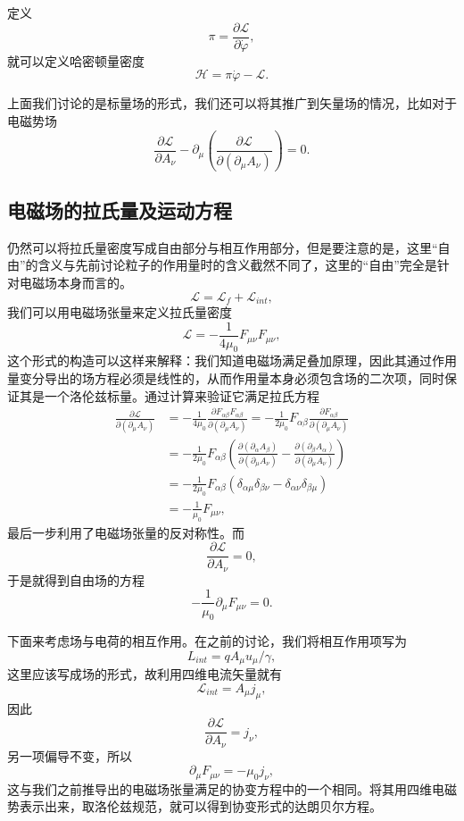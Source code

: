 \documentclass[UTF8]{ctexbook}
\numberwithin{equation}{chapter}
\begin{document}
	定义
	\[\pi=\frac{\partial \mathcal{L}}{\partial \dot{\varphi}},\]
	就可以定义哈密顿量密度
	\[\mathcal{H}=\pi\dot{\varphi}-\mathcal{L}.\]
	
	上面我们讨论的是标量场的形式，我们还可以将其推广到矢量场的情况，比如对于电磁势场
	\[\frac{\partial \mathcal{L}}{\partial A_\nu} - \partial_\mu\left(\frac{\partial \mathcal{L}}{\partial (\partial_\mu A_\nu)}\right)=0.\]
	
	\subsection{电磁场的拉氏量及运动方程}
	
	仍然可以将拉氏量密度写成自由部分与相互作用部分，但是要注意的是，这里“自由”的含义与先前讨论粒子的作用量时的含义截然不同了，这里的“自由”完全是针对电磁场本身而言的。
	\[\mathcal{L}=\mathcal{L}_f+\mathcal{L}_{int},\]
	我们可以用电磁场张量来定义拉氏量密度
	\[\mathcal{L}=-\frac{1}{4\mu_0}F_{\mu\nu}F_{\mu\nu},\]
	这个形式的构造可以这样来解释：我们知道电磁场满足叠加原理，因此其通过作用量变分导出的场方程必须是线性的，从而作用量本身必须包含场的二次项，同时保证其是一个洛伦兹标量。通过计算来验证它满足拉氏方程
	\begin{align*}
		\frac{\partial \mathcal{L}}{\partial (\partial_\mu A_\nu)}&=-\frac{1}{4\mu_0}\frac{\partial F_{\alpha\beta}F_{\alpha\beta}}{\partial (\partial_\mu A_\nu)} =-\frac{1}{2\mu_0}F_{\alpha\beta}\frac{\partial F_{\alpha\beta}}{\partial (\partial_\mu A_\nu)}\\
		&=-\frac{1}{2\mu_0}F_{\alpha\beta}\left(\frac{\partial(\partial_{\alpha}A_\beta)}{\partial (\partial_\mu A_\nu)}-\frac{\partial(\partial_\beta A_\alpha)}{\partial (\partial_\mu A_\nu)}\right) \\
		&=-\frac{1}{2\mu_0}F_{\alpha\beta}(\delta_{\alpha\mu}\delta_{\beta\nu}-\delta_{\alpha\nu}\delta_{\beta\mu}) \\
		&=-\frac{1}{\mu_0}F_{\mu\nu},
	\end{align*}
	最后一步利用了电磁场张量的反对称性。而
	\[\frac{\partial \mathcal{L}}{\partial A_\nu}=0,\]
	于是就得到自由场的方程
	\[-\frac{1}{\mu_0}\partial_\mu F_{\mu\nu}=0.\]
	
	下面来考虑场与电荷的相互作用。在之前的讨论，我们将相互作用项写为
	\[L_{int}=qA_\mu u_\mu/\gamma,\]
	这里应该写成场的形式，故利用四维电流矢量就有
	\[\mathcal{L}_{int}=A_\mu j_\mu,\]
	因此
	\[\frac{\partial \mathcal{L}}{\partial A_\nu}=j_\nu,\]
	另一项偏导不变，所以
	\[\partial_\mu F_{\mu\nu}=-\mu_0 j_\nu,\]
	这与我们之前推导出的电磁场张量满足的协变方程中的一个相同。将其用四维电磁势表示出来，取洛伦兹规范，就可以得到协变形式的达朗贝尔方程。
	
\end{document}
